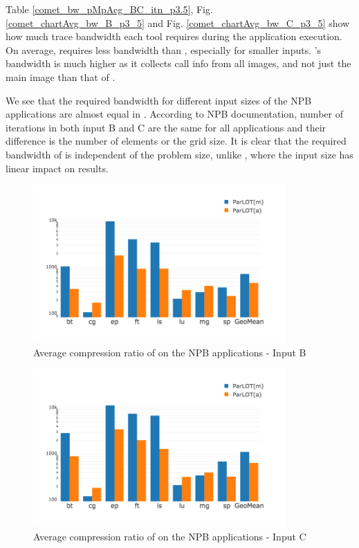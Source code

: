 Table \ref{comet_bw_pMpAcg_BC_itn_p3.5}, Fig.  \ref{comet_chartAvg_bw_B_p3_5} and Fig. \ref{comet_chartAvg_bw_C_p3_5} show how much trace bandwidth each tool 
requires
during the application execution. 
%
On average, \parlotm requires less bandwidth than
\callgrind, especially for smaller inputs. 
%
\parlota's bandwidth is much higher as it collects call info from all
images, and not just the main image than that of \parlotm.

We see that the required bandwidth for different input sizes of the NPB applications are almost equal in \parlot. According to NPB documentation, number of iterations in both input B and C are the same for all applications and their difference is the number of elements or the grid size. It is clear that the required bandwidth of \parlot is independent of the problem size, unlike \callgrind, where the input size has linear impact on results.

%
\begin{figure}[t]
\centering
\includegraphics[width=3.8in]{figs.comet.newMed/comet_chartAvg_cr_B_p3_5.png}
\caption{ Average compression ratio of \parlot on the NPB applications - Input B}
\label{comet_chartAvg_cr_B_p3_5}
\end{figure}

\begin{figure}[t]
\centering
\includegraphics[width=3.8in]{figs.comet.newMed/comet_chartAvg_cr_C_p3_5.png}
\caption{ Average compression ratio of \parlot on the NPB applications - Input C}
\label{comet_chartAvg_cr_C_p3_5}
\end{figure}




